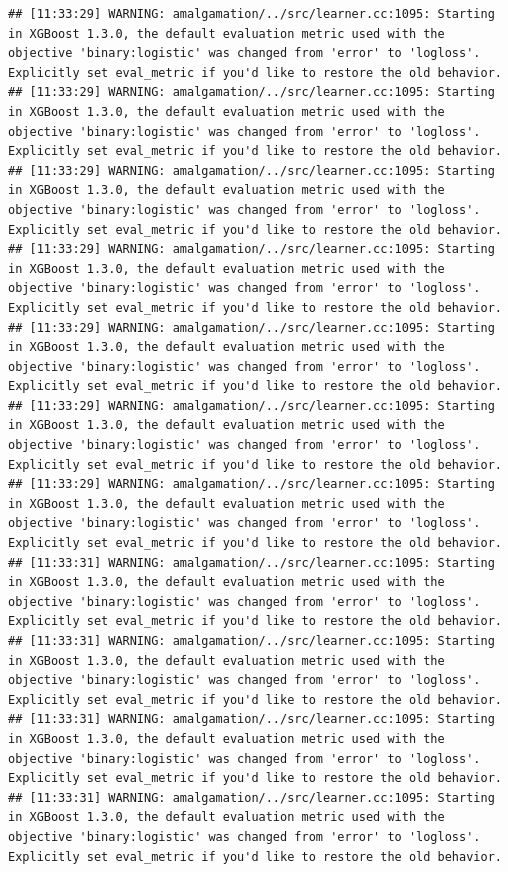 \documentclass[
]{scrbook}
\begin{document}
\begin{verbatim}
## [11:33:29] WARNING: amalgamation/../src/learner.cc:1095: Starting in XGBoost 1.3.0, the default evaluation metric used with the objective 'binary:logistic' was changed from 'error' to 'logloss'. Explicitly set eval_metric if you'd like to restore the old behavior.
## [11:33:29] WARNING: amalgamation/../src/learner.cc:1095: Starting in XGBoost 1.3.0, the default evaluation metric used with the objective 'binary:logistic' was changed from 'error' to 'logloss'. Explicitly set eval_metric if you'd like to restore the old behavior.
## [11:33:29] WARNING: amalgamation/../src/learner.cc:1095: Starting in XGBoost 1.3.0, the default evaluation metric used with the objective 'binary:logistic' was changed from 'error' to 'logloss'. Explicitly set eval_metric if you'd like to restore the old behavior.
## [11:33:29] WARNING: amalgamation/../src/learner.cc:1095: Starting in XGBoost 1.3.0, the default evaluation metric used with the objective 'binary:logistic' was changed from 'error' to 'logloss'. Explicitly set eval_metric if you'd like to restore the old behavior.
## [11:33:29] WARNING: amalgamation/../src/learner.cc:1095: Starting in XGBoost 1.3.0, the default evaluation metric used with the objective 'binary:logistic' was changed from 'error' to 'logloss'. Explicitly set eval_metric if you'd like to restore the old behavior.
## [11:33:29] WARNING: amalgamation/../src/learner.cc:1095: Starting in XGBoost 1.3.0, the default evaluation metric used with the objective 'binary:logistic' was changed from 'error' to 'logloss'. Explicitly set eval_metric if you'd like to restore the old behavior.
## [11:33:29] WARNING: amalgamation/../src/learner.cc:1095: Starting in XGBoost 1.3.0, the default evaluation metric used with the objective 'binary:logistic' was changed from 'error' to 'logloss'. Explicitly set eval_metric if you'd like to restore the old behavior.
## [11:33:31] WARNING: amalgamation/../src/learner.cc:1095: Starting in XGBoost 1.3.0, the default evaluation metric used with the objective 'binary:logistic' was changed from 'error' to 'logloss'. Explicitly set eval_metric if you'd like to restore the old behavior.
## [11:33:31] WARNING: amalgamation/../src/learner.cc:1095: Starting in XGBoost 1.3.0, the default evaluation metric used with the objective 'binary:logistic' was changed from 'error' to 'logloss'. Explicitly set eval_metric if you'd like to restore the old behavior.
## [11:33:31] WARNING: amalgamation/../src/learner.cc:1095: Starting in XGBoost 1.3.0, the default evaluation metric used with the objective 'binary:logistic' was changed from 'error' to 'logloss'. Explicitly set eval_metric if you'd like to restore the old behavior.
## [11:33:31] WARNING: amalgamation/../src/learner.cc:1095: Starting in XGBoost 1.3.0, the default evaluation metric used with the objective 'binary:logistic' was changed from 'error' to 'logloss'. Explicitly set eval_metric if you'd like to restore the old behavior.
\end{verbatim}
\end{document}
